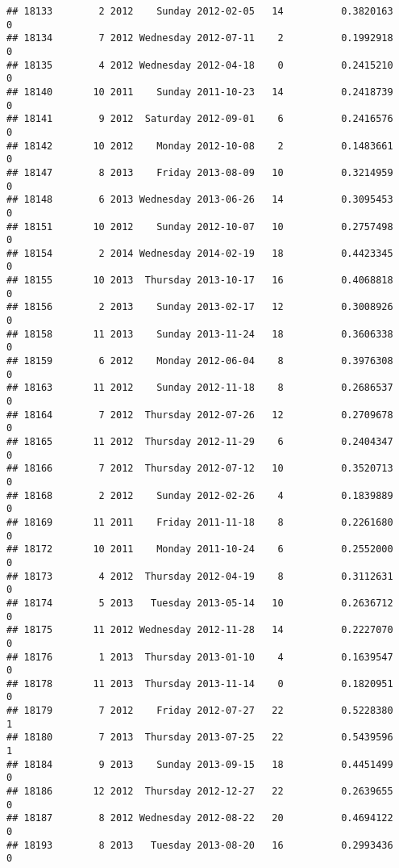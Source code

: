 \documentclass[
]{article}
\begin{document}
\begin{verbatim}
## 18133        2 2012    Sunday 2012-02-05   14          0.3820163             0
## 18134        7 2012 Wednesday 2012-07-11    2          0.1992918             0
## 18135        4 2012 Wednesday 2012-04-18    0          0.2415210             0
## 18140       10 2011    Sunday 2011-10-23   14          0.2418739             0
## 18141        9 2012  Saturday 2012-09-01    6          0.2416576             0
## 18142       10 2012    Monday 2012-10-08    2          0.1483661             0
## 18147        8 2013    Friday 2013-08-09   10          0.3214959             0
## 18148        6 2013 Wednesday 2013-06-26   14          0.3095453             0
## 18151       10 2012    Sunday 2012-10-07   10          0.2757498             0
## 18154        2 2014 Wednesday 2014-02-19   18          0.4423345             0
## 18155       10 2013  Thursday 2013-10-17   16          0.4068818             0
## 18156        2 2013    Sunday 2013-02-17   12          0.3008926             0
## 18158       11 2013    Sunday 2013-11-24   18          0.3606338             0
## 18159        6 2012    Monday 2012-06-04    8          0.3976308             0
## 18163       11 2012    Sunday 2012-11-18    8          0.2686537             0
## 18164        7 2012  Thursday 2012-07-26   12          0.2709678             0
## 18165       11 2012  Thursday 2012-11-29    6          0.2404347             0
## 18166        7 2012  Thursday 2012-07-12   10          0.3520713             0
## 18168        2 2012    Sunday 2012-02-26    4          0.1839889             0
## 18169       11 2011    Friday 2011-11-18    8          0.2261680             0
## 18172       10 2011    Monday 2011-10-24    6          0.2552000             0
## 18173        4 2012  Thursday 2012-04-19    8          0.3112631             0
## 18174        5 2013   Tuesday 2013-05-14   10          0.2636712             0
## 18175       11 2012 Wednesday 2012-11-28   14          0.2227070             0
## 18176        1 2013  Thursday 2013-01-10    4          0.1639547             0
## 18178       11 2013  Thursday 2013-11-14    0          0.1820951             0
## 18179        7 2012    Friday 2012-07-27   22          0.5228380             1
## 18180        7 2013  Thursday 2013-07-25   22          0.5439596             1
## 18184        9 2013    Sunday 2013-09-15   18          0.4451499             0
## 18186       12 2012  Thursday 2012-12-27   22          0.2639655             0
## 18187        8 2012 Wednesday 2012-08-22   20          0.4694122             0
## 18193        8 2013   Tuesday 2013-08-20   16          0.2993436             0

\end{verbatim}
\end{document}
